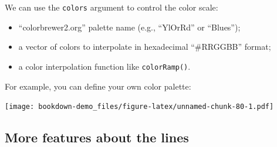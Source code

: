 \documentclass[]{book}
\newenvironment{Shaded}{\begin{snugshade}}{\end{snugshade}}
\newcommand{\KeywordTok}[1]{\textcolor[rgb]{0.13,0.29,0.53}{\textbf{#1}}}
\newcommand{\DataTypeTok}[1]{\textcolor[rgb]{0.13,0.29,0.53}{#1}}
\newcommand{\DecValTok}[1]{\textcolor[rgb]{0.00,0.00,0.81}{#1}}
\newcommand{\StringTok}[1]{\textcolor[rgb]{0.31,0.60,0.02}{#1}}
\newcommand{\OtherTok}[1]{\textcolor[rgb]{0.56,0.35,0.01}{#1}}
\newcommand{\OperatorTok}[1]{\textcolor[rgb]{0.81,0.36,0.00}{\textbf{#1}}}
\newcommand{\NormalTok}[1]{#1}
\providecommand{\tightlist}{%
  \setlength{\itemsep}{0pt}\setlength{\parskip}{0pt}}
\begin{document}
We can use the \texttt{colors} argument to control the color scale:

\begin{itemize}
\tightlist
\item
  ``colorbrewer2.org'' palette name (e.g., ``YlOrRd'' or ``Blues'');
\item
  a vector of colors to interpolate in hexadecimal ``\#RRGGBB'' format;
\item
  a color interpolation function like \texttt{colorRamp()}.
\end{itemize}

For example, you can define your own color palette:

\begin{Shaded}
\end{Shaded}

\texttt{[image: bookdown-demo\_files/figure-latex/unnamed-chunk-80-1.pdf]}

\subsection{More features about the
lines}\label{more-features-about-the-lines}
\end{document}
